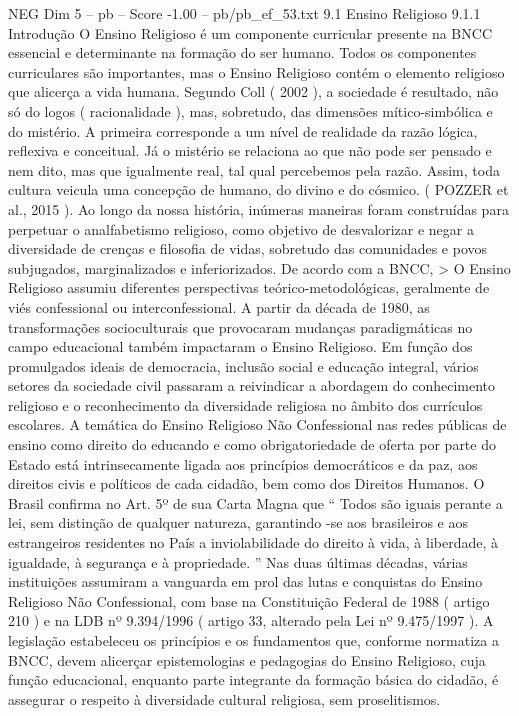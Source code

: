 \begin{textsample}{NEG Dim 5 – pb – Score -1.00 – pb/pb\_ef\_53.txt}  \label{ex:f5_neg_193}
9.1 Ensino Religioso 9.1.1 Introdução O Ensino Religioso é um componente curricular presente na BNCC essencial e determinante na formação do ser humano.
Todos os componentes curriculares são importantes, mas o Ensino Religioso contém o elemento religioso que alicerça a vida humana.
Segundo Coll ( 2002 ), a sociedade é resultado, não só do logos ( racionalidade ), mas, sobretudo, das dimensões mítico-simbólica e do mistério.
A primeira corresponde a um nível de realidade da razão lógica, reflexiva e conceitual.
Já o mistério se relaciona ao que não pode ser pensado e nem dito, mas que igualmente real, tal qual percebemos pela razão.
Assim, toda cultura veicula uma concepção de humano, do divino e do cósmico. ( POZZER et al., 2015 ).
Ao longo da nossa história, inúmeras maneiras foram construídas para perpetuar o analfabetismo religioso, como objetivo de desvalorizar e negar a diversidade de crenças e filosofia de vidas, sobretudo das comunidades e povos subjugados, marginalizados e inferiorizados.
De acordo com a BNCC, > O Ensino Religioso assumiu diferentes perspectivas teórico-metodológicas, geralmente de viés confessional ou interconfessional.
A partir da década de 1980, as transformações socioculturais que provocaram mudanças paradigmáticas no campo educacional também impactaram o Ensino Religioso.
Em função dos promulgados ideais de democracia, inclusão social e educação integral, vários setores da sociedade civil passaram a reivindicar a abordagem do conhecimento religioso e o reconhecimento da diversidade religiosa no âmbito dos currículos escolares.
A temática do Ensino Religioso Não Confessional nas redes públicas de ensino como direito do educando e como obrigatoriedade de oferta por parte do Estado está intrinsecamente ligada aos princípios democráticos e da paz, aos direitos civis e políticos de cada cidadão, bem como dos Direitos Humanos.
O Brasil confirma no Art. 5º de sua Carta Magna que “ Todos são iguais perante a lei, sem distinção de qualquer natureza, garantindo -se aos brasileiros e aos estrangeiros residentes no País a inviolabilidade do direito à vida, à liberdade, à igualdade, à segurança e à propriedade. ” Nas duas últimas décadas, várias instituições assumiram a vanguarda em prol das lutas e conquistas do Ensino Religioso Não Confessional, com base na Constituição Federal de 1988 ( artigo 210 ) e na LDB nº 9.394/1996 ( artigo 33, alterado pela Lei nº 9.475/1997 ).
A legislação estabeleceu os princípios e os fundamentos que, conforme normatiza a BNCC, devem alicerçar epistemologias e pedagogias do Ensino Religioso, cuja função educacional, enquanto parte integrante da formação básica do cidadão, é assegurar o respeito à diversidade cultural religiosa, sem proselitismos.

\end{textsample}
